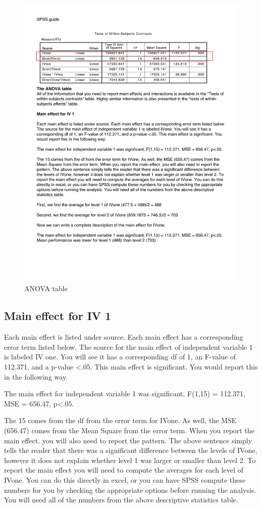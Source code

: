 \begin{figure}
      \includegraphics[width=\linewidth]{LabmanualFigures/SPSS13.pdf}
      \caption{ANOVA table}
      \label{fig:SPSS13}
\end{figure}

\subsection{Main effect for IV 1}

Each main effect is listed under source. Each main effect has a corresponding error term listed below. The source for the main effect of independent variable 1 is labeled IV one. You will see it has a corresponding df of 1, an F-value of 112.371, and a p-value <.05. This main effect is significant. You would report this in the following way.

The main effect for independent variable 1 was significant, F(1,15) = 112.371, MSE = 656.47, p<.05. 

The 15 comes from the df from the error term for IVone. As well, the MSE (656.47) comes from the Mean Square from the error term. When you report the main effect, you will also need to report the pattern. The above sentence simply tells the reader that there was a significant difference between the levels of IVone, however it does not explain whether level 1 was larger or smaller than level 2. To report the main effect you will need to compute the averages for each level of IVone. You can do this directly in excel, or you can have SPSS compute these numbers for you by checking the appropriate options before running the analysis. You will need all of the numbers from the above descriptive statistics table. 

